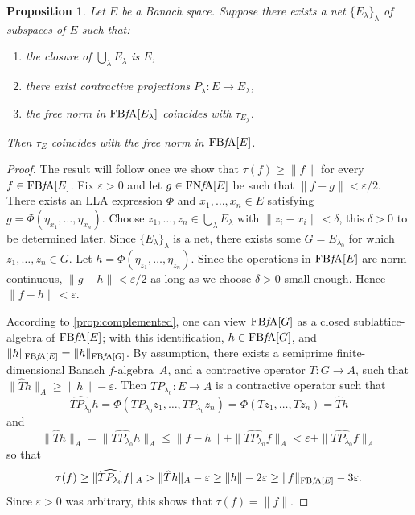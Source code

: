 \documentclass{memo-l}
\newtheorem{prop}[theorem]{Proposition}
\theoremstyle{definition}
\theoremstyle{remark}
\numberwithin{section}{chapter}
\numberwithin{equation}{chapter}
\newcommand{\falg}{$f\!$-algebra}
\newcommand{\FNFA}[1]{\operatorname{FN{\it f}\!A}[#1]}
\newcommand{\FBFA}[1]{\operatorname{FB{\it f}\!A}[#1]}
\begin{document}
\begin{prop}\label{prop:tau_is_norm}
    Let $E$ be a Banach space. Suppose
    there exists a net $\{E_\lambda \}_\lambda $ of
    subspaces of $E$ such that:
    \begin{enumerate}
        \item the closure of $\bigcup_{\lambda}E_\lambda $ is $E$,
        \item there exist contractive projections $P_\lambda \colon
        E\to E_\lambda $,
        \item the free norm in $\FBFA{E_\lambda }$ coincides with $\tau
        _{E_\lambda }$.
    \end{enumerate}
    Then $\tau _{E}$ coincides with the free norm in $\FBFA{E}$.
\end{prop}
\begin{proof}
    The result will follow once we show that $\tau (f)\ge \|f\|$ for
    every $f \in \FBFA E$. Fix $\varepsilon >0$ and let $g \in \FNFA
    E$ be such that $\|f-g\|<\varepsilon/2$. There exists an LLA
    expression $\Phi $ and $x_1,\ldots ,x_n \in E$ satisfying $g=\Phi
    (\eta _{x_1},\ldots ,\eta _{x_n})$. Choose $z_1,\ldots ,z_n \in
    \bigcup_{\lambda } E_\lambda $ with $\|z_i-x_i\|<\delta $, this
    $\delta >0$ to be determined later. Since $\{E_\lambda
    \}_\lambda $ is a net, there exists some $G =E_{\lambda _0}$ for
    which $z_1,\ldots ,z_n \in G$.
    Let $h=\Phi (\eta _{z_1},\ldots ,\eta _{z_n})$. Since the
    operations in $\FBFA E$ are norm continuous,
    $\|g-h\|<\varepsilon/2 $ as long as we choose $\delta >0$ small enough. Hence
    $\|f-h\|<\varepsilon$.

    According to \cref{prop:complemented},
    one can view $\FBFA G$ as a closed sublattice-algebra of $\FBFA
    E$; with this identification, $h \in \FBFA G$, and $\|h\|_{\FBFA
    E}= \|h\|_{\FBFA G}$. By
    assumption, there exists a semiprime finite-dimensional Banach
    \falg\ $A$, and a contractive operator
    $T\colon G\to A$, such that $\|\hat{T}h\|_A\ge\|h\|
    -\varepsilon$. Then
    $TP_{\lambda_0}\colon E\to A$ is a contractive operator such that
    \[
        \widehat{TP_{\lambda_0} }h=\Phi (TP_{\lambda_0} z_1,\ldots
        ,TP_{\lambda_0}
    z_n)=\Phi (Tz_1,\ldots ,Tz_n)=\hat{T}h
    \]
    and
    \[
        \|\hat{T}h\|_A=\|\widehat{TP_{\lambda_0} }h\|_A\le \|f-h\|+\|\widehat{TP_{\lambda_0}
        }f\|_A<\varepsilon +\|\widehat{TP_{\lambda_0} }f\|_A
    \]
    so that
    \[
    \tau (f)\ge \|\widehat{TP_{\lambda_0} }f\|_A> \|\hat{T}h\|_A-\varepsilon\ge
    \|h\|-2\varepsilon \ge \|f\|_{\FBFA E}-3\varepsilon.
    \]
    Since $\varepsilon >0$ was arbitrary, this shows that $\tau (f)=
    \|f\|$.
\end{proof}
\end{document}
